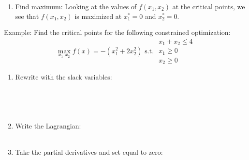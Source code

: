\documentclass[]{book}
\providecommand{\tightlist}{%
  \setlength{\itemsep}{0pt}\setlength{\parskip}{0pt}}
\theoremstyle{definition}
\theoremstyle{definition}
\theoremstyle{definition}
\theoremstyle{remark}
\let\BeginKnitrBlock\begin \let\EndKnitrBlock\end
\begin{document}
\begin{enumerate}
\def\labelenumi{\arabic{enumi}.}
\setcounter{enumi}{4}
\tightlist
\item
  Find maximum:
  Looking at the values of \(f(x_1,x_2)\) at the critical points, we see that \(f(x_1,x_2)\) is maximized at \(x_1^* = 0\) and \(x_2^*=0\).
\end{enumerate}

\BeginKnitrBlock{exercise}
\protect\hypertarget{exr:unnamed-chunk-62}{}{\label{exr:unnamed-chunk-62} }Example: Find the critical points for the following constrained optimization:
\[\max_{x_1,x_2} f(x) = -(x_1^2 + 2x_2^2) \text{ s.t. } 
\begin{array}{l}
x_1 + x_2 \le 4\\
x_1 \ge 0\\
x_2 \ge 0
\end{array}\]
\EndKnitrBlock{exercise}

\begin{enumerate}
\def\labelenumi{\arabic{enumi}.}
\item
  Rewrite with the slack variables:
  \[\phantom{max_{x_1,x_2} f(x) = -(x_1^2 + 2x_2^2) \text{ s.t. } 
  \begin{array}{l}
  x_1 + x_2 \le 4 - s_1^2\\
  -x_1 \le 0 - s_2^2\\
  -x_2 \le 0 - s_3^2
  \end{array}}\]
\item
  Write the Lagrangian:
  \[\phantom{L(x_1, x_2, \lambda_1, \lambda_2, \lambda_3, s_1, s_2, s_3) =  -(x_1^2 + 2x_2^2) - \lambda_1(x_1 + x_2 + s_1^2  - 4) - \lambda_2(-x_1 + s_2^2) - \lambda_3(-x_2 + s_3^2)}\]
\item
  Take the partial derivatives and set equal to zero:
\end{enumerate}

\end{document}
